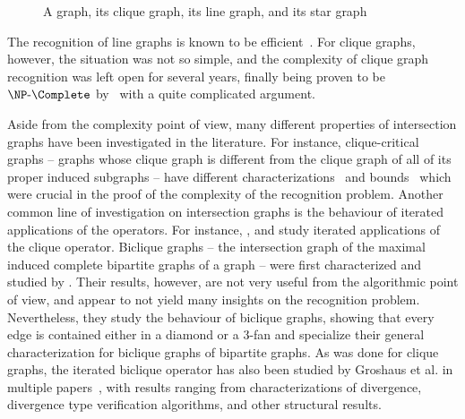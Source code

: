 \begin{figure}[!htb]
    \hfill
    \hfill
    \caption{A graph, its clique graph, its line graph, and its star graph}
    \label{fig:my_label}
\end{figure}

The recognition of line graphs is known to be efficient~\citep{line_dynamic,line_nich,line_naor}.
For clique graphs, however, the situation was not so simple, and the complexity of clique graph recognition was left open for several years, finally being proven to be $\NPc$ by~\cite{clique_recognition} with a quite complicated argument.

Aside from the complexity point of view, many different properties of intersection graphs have been investigated in the literature.
For instance, clique-critical graphs -- graphs whose clique graph is different from the clique graph of all of its proper induced subgraphs -- have different characterizations~\citep{clique_critical_toft} and bounds~\citep{clique_critical_alcon} which were crucial in the proof of the complexity of the recognition problem.
Another common line of investigation on intersection graphs is the behaviour of iterated applications of the operators.
For instance, \cite{clique_iterated}, and \cite{clique_divergent} study iterated applications of the clique operator.
Biclique graphs -- the intersection graph of the maximal induced complete bipartite graphs of a graph -- were first characterized and studied by \cite{biclique_graph}.
Their results, however, are not very useful from the algorithmic point of view, and appear to not yield many insights on the recognition problem.
Nevertheless, they study the behaviour of biclique graphs, showing that every edge is contained either in a diamond or a 3-fan and specialize their general characterization for biclique graphs of bipartite graphs.
As was done for clique graphs, the iterated biclique operator has also been studied by Groshaus et al. in multiple papers~\citep{biclique_iterated, almost_all_biclique}, with results ranging from characterizations of divergence, divergence type verification algorithms, and other structural results.

